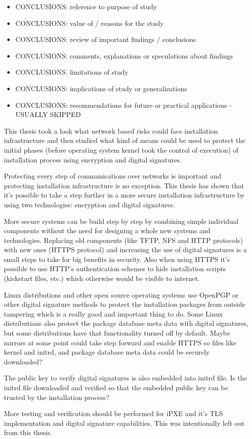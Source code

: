 
\begin{itemize}
\item CONCLUSIONS: reference to purpose of study
\item CONCLUSIONS: value of / reasons for the study
\item CONCLUSIONS: review of important findings / conclusions
\item CONCLUSIONS: comments, explanations or speculations about findings
\item CONCLUSIONS: limitations of study
\item CONCLUSIONS: implications of study or generalizations
\item CONCLUSIONS: recommendations for future or practical applications - USUALLY SKIPPED
\end{itemize}

This thesis took a look what network based risks could face
installation infrastructure and then studied what kind of means could
be used to protect the initial phases (before operating system kernel
took the control of execution) of installation process using
encryption and digital signatures.

Protecting every step of communications over networks is important and
protecting installation infrastructure is no exception. This thesis
has shown that it's possible to take a step further in a more secure
installation infrastructure by using two technologies: encryption and
digital signatures.

More secure systems can be build step by step by combining simple
individual components without the need for designing a whole new
systems and technologies. Replacing old components (like TFTP, NFS and
HTTP protocols) with new ones (HTTPS protocol) and increasing the use
of digital signatures is a small steps to take for big benefits in
security. Also when using HTTPS it's possible to use HTTP's
authentication schemes to hide installation scripts (kickstart files,
etc.) which otherwise would be visible to internet.

Linux distributions and other open source operating systems use
OpenPGP or other digital signature methods to protect the installation
packages from outside tampering which is a really good and important
thing to do. Some Linux distributions also protect the package
database meta data with digital signatures, but some distributions
have that functionality turned off by default. Maybe mirrors at some
point could take step forward and enable HTTPS so files like kernel
and initrd, and package database meta data could be securely
downloaded?

The public key to verify digital signatures is also embedded into
initrd file. Is the initrd file downloaded and verified so that the
embedded public key can be trusted by the installation process?

More testing and verification should be performed for iPXE and it's
TLS implementation and digital signature capabilities. This was
intentionally left out from this thesis.
